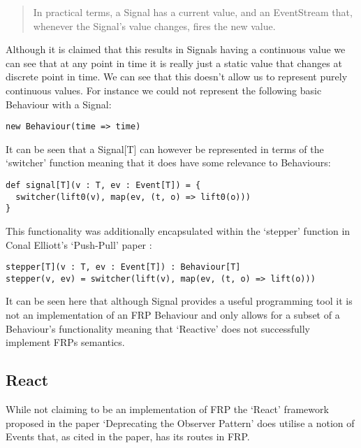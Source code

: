       \begin{quote}
        In practical terms, a Signal has a current value, and an EventStream that, whenever the Signal's value changes,     
        fires the new value.
      \end{quote}  

      Although it is claimed that this results in Signals having a continuous value we can see
      that at any point in time it is really just a static value that changes at discrete point in
      time. We can see that this doesn't allow us to represent purely continuous values. For instance
      we could not represent the following basic Behaviour with a Signal:

\begin{verbatim}
new Behaviour(time => time)
\end{verbatim}

      It can be seen that a Signal[T] can however be represented in terms
      of the `switcher' function meaning that it does have some relevance to Behaviours:

\begin{verbatim}
def signal[T](v : T, ev : Event[T]) = {
  switcher(lift0(v), map(ev, (t, o) => lift0(o)))
}
\end{verbatim}  

      This functionality was additionally encapsulated within the `stepper' function in Conal Elliott's
      `Push-Pull' paper \cite{Elliott2009}:

\begin{verbatim}
stepper[T](v : T, ev : Event[T]) : Behaviour[T]
stepper(v, ev) = switcher(lift(v), map(ev, (t, o) => lift(o)))
\end{verbatim} 

      It can be seen here that although Signal provides a useful programming tool it is not an implementation
      of an FRP Behaviour and only allows for a subset of a Behaviour's functionality meaning that `Reactive'
      does not successfully implement FRPs semantics.

    \subsection{React}
      While not claiming to be an implementation of FRP the `React' framework proposed in the 
      paper `Deprecating the Observer Pattern' \cite{Maier2010} does utilise a notion of Events that, as cited in the paper,
      has its routes in FRP.

